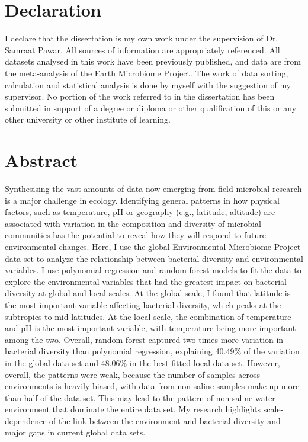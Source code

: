 \documentclass[11pt, a4paper]{article}
\begin{document}
\begin{spacing}{1.5}


\section*{Declaration}

I declare that the dissertation is my own work under the supervision of Dr. Samraat Pawar. All sources of information are appropriately referenced. All datasets analysed in this work have been previously published, and data are from the meta-analysis of the Earth Microbiome Project. The work of data sorting, calculation and statistical analysis is done by myself with the suggestion of my supervisor. No portion of the work referred to in the dissertation has been submitted in support of a degree or diploma or other qualification of this or any other university or other institute of learning. 

\clearpage

\section*{Abstract}

Synthesising the vast amounts of data now emerging from field microbial research is a major challenge in ecology. Identifying general patterns in how physical factors, such as temperature, pH or geography (e.g., latitude, altitude) are associated with variation in the composition and diversity of microbial communities has the potential to reveal how they will respond to future environmental changes. Here, I use the  global Environmental Microbiome Project data set to analyze the relationship between bacterial diversity and environmental variables. I use polynomial regression and random forest models to fit the data to explore the environmental variables that had the greatest impact on bacterial diversity at global and local scales. At the global scale, I found that latitude is the most important variable affecting bacterial diversity, which peaks at the subtropics to mid-latitudes. At the local scale, the combination of temperature and pH is the most important variable, with temperature being more important among the two. Overall, random forest captured two times more variation in bacterial diversity than polynomial regression, explaining 40.49\% of the variation in the global data set and 48.06\% in the best-fitted local data set. However, overall, the patterns were weak, because the number of samples across environments is heavily biased, with data from non-saline samples make up more than half of the data set. This may lead to the pattern of non-saline water environment that dominate the entire data set. My research highlights scale-dependence of the link between the environment and bacterial diversity and major gaps in current global data sets. 


\end{spacing}
\end{document}
